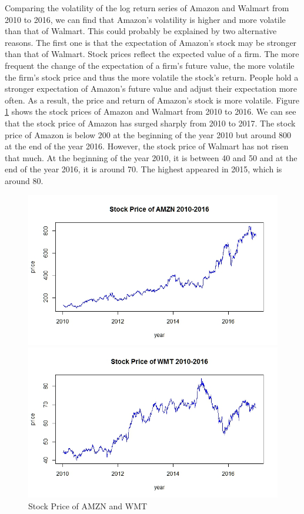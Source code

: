 \documentclass[paper=a4, fontsize=11pt]{article}
\begin{document}
Comparing the volatility of the log return series of Amazon and Walmart from 2010 to 2016, we can find that Amazon's volatility is higher and more volatile than that of Walmart. This could probably be explained by two alternative reasons. The first one is that the expectation of Amazon's stock may be stronger than that of Walmart. Stock prices reflect the expected value of a firm. The more frequent the change of the expectation of a firm's future value, the more volatile the firm's stock price and thus the more volatile the stock's return. People hold a stronger expectation of Amazon’s future value and adjust their expectation more often. As a result, the price and return of Amazon's stock is more volatile. Figure \ref{price} shows the stock prices of Amazon and Walmart from 2010 to 2016. We can see that the stock price of Amazon has surged sharply from 2010 to 2017. The stock price of Amazon is below 200 at the beginning of the year 2010 but around 800 at the end of the year 2016. However, the stock price of Walmart has not risen that much. At the beginning of the year 2010, it is between 40 and 50 and at the end of the year 2016, it is around 70. The highest appeared in 2015, which is around 80.

\begin{figure}[!htbp]
\begin{minipage}[!htbp]{0.5\linewidth}
\centering
\includegraphics[scale = 0.45]{img/price_AMZN}
\end{minipage}
\begin{minipage}[!htbp]{0.5\linewidth}
\centering
\includegraphics[scale = 0.45]{img/price_WMT}
\end{minipage}
\caption{Stock Price of AMZN and WMT}
\label{price}
\end{figure}
\end{document}

